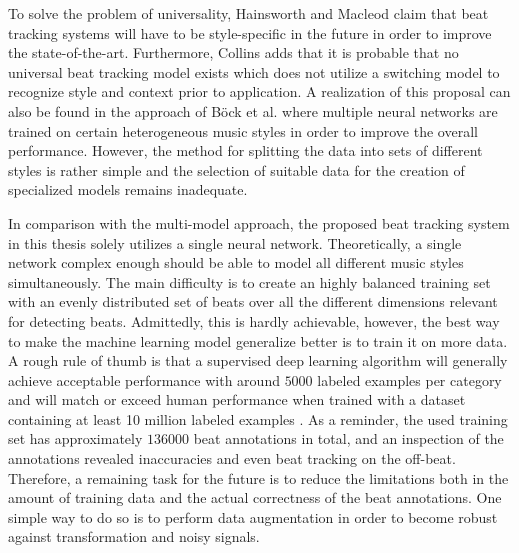 \documentclass{scrartcl}
\begin{document}

To solve the problem of universality, Hainsworth and Macleod \cite{Hainsworth2004} claim that beat tracking systems will have to be style-specific in the future in order to improve the state-of-the-art. Furthermore, Collins \cite{Collins2006} adds that it is probable that no universal beat tracking model exists which does not utilize a switching model to recognize style and context prior to application. A realization of this proposal can also be found in the approach of Böck et al. \cite{Boeck2014} where multiple neural networks are trained on certain heterogeneous music styles in order to improve the overall performance. However, the method for splitting the data into sets of different styles is rather simple and the selection of suitable data for the creation of specialized models remains inadequate. 

In comparison with the multi-model approach, the proposed beat tracking system in this thesis solely utilizes a single neural network. Theoretically, a single network complex enough should be able to  model all different music styles simultaneously. The main difficulty is to create an highly balanced training set with an evenly distributed set of beats over all the different dimensions relevant for detecting beats. Admittedly, this is hardly achievable, however, the best way to make the machine learning model generalize better is to train it on more data. A rough rule of thumb is that a supervised deep learning algorithm will generally achieve acceptable performance with around $\num[group-separator={,}]{5000}$ labeled examples per category and will match or exceed human performance when trained with a dataset containing at least 10 million labeled examples \cite{Goodfellow2016}. As a reminder, the used training set has approximately $\num[group-separator={,}]{136000}$ beat annotations in total, and an inspection of the annotations revealed inaccuracies and even beat tracking on the off-beat. Therefore, a remaining task for the future is to reduce the limitations both in the amount of training data and the actual correctness of the beat annotations. One simple way to do so is to perform data augmentation in order to become robust against transformation and noisy signals. 
\end{document}
